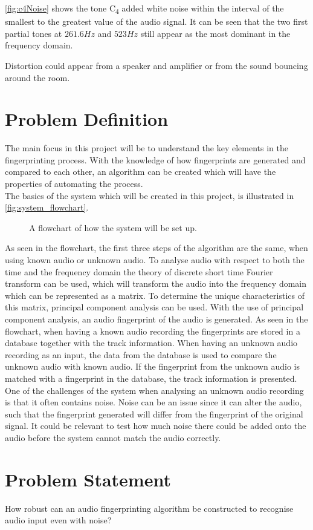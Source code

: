 \noindent\autoref{fig:c4Noise} shows the tone C\textsubscript{4} added white noise within the interval of the smallest to the greatest value of the audio signal. It can be seen that the two first partial tones at $261.6 \si{Hz}$ and $523 \si{Hz}$ still appear as the most dominant in the frequency domain.

Distortion could appear from a speaker and amplifier or from the sound bouncing around the room.\cite{haitsma2003highly}

\section{Problem Definition}
The main focus in this project will be to understand the key elements in the fingerprinting process. With the knowledge of how fingerprints are generated and compared to each other, an algorithm can be created which will have the properties of automating the process.\\
The basics of the system which will be created in this project, is illustrated in \autoref{fig:system_flowchart}.

\begin{figure}[H]
    
    \caption{A flowchart of how the system will be set up.}
    \label{fig:system_flowchart}
\end{figure}

As seen in the flowchart, the first three steps of the algorithm are the same, when using known audio or unknown audio. To analyse audio with respect to both the time and the frequency domain the theory of discrete short time Fourier transform can be used, which will transform the audio into the frequency domain which can be represented as a matrix.
To determine the unique characteristics of this matrix, principal component analysis can be used. With the use of principal component analysis, an audio fingerprint of the audio is generated. As seen in the flowchart, when having a known audio recording the fingerprints are stored in a database together with the track information. When having an unknown audio recording as an input, the data from the database is used to compare the unknown audio with known audio. If the fingerprint from the unknown audio is matched with a fingerprint in the database, the track information is presented.\\

One of the challenges of the system when analysing an unknown audio recording is that it often contains noise. Noise can be an issue since it can alter the audio, such that the fingerprint generated will differ from the fingerprint of the original signal. It could be relevant to test how much noise there could be added onto the audio before the system cannot match the audio correctly.

\section{Problem Statement}
How robust can an audio fingerprinting algorithm be constructed to recognise audio input even with noise? 

